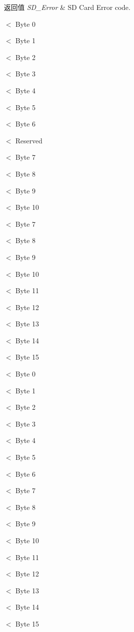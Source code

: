 \begin{DoxyRetVals}{返回值}
{\em S\+D\+\_\+\+Error} & SD Card Error code. \\
\hline
\end{DoxyRetVals}
$<$ Byte 0

$<$ Byte 1

$<$ Byte 2

$<$ Byte 3

$<$ Byte 4

$<$ Byte 5

$<$ Byte 6

$<$ Reserved

$<$ Byte 7

$<$ Byte 8

$<$ Byte 9

$<$ Byte 10

$<$ Byte 7

$<$ Byte 8

$<$ Byte 9

$<$ Byte 10

$<$ Byte 11

$<$ Byte 12

$<$ Byte 13

$<$ Byte 14

$<$ Byte 15

$<$ Byte 0

$<$ Byte 1

$<$ Byte 2

$<$ Byte 3

$<$ Byte 4

$<$ Byte 5

$<$ Byte 6

$<$ Byte 7

$<$ Byte 8

$<$ Byte 9

$<$ Byte 10

$<$ Byte 11

$<$ Byte 12

$<$ Byte 13

$<$ Byte 14

$<$ Byte 15 
